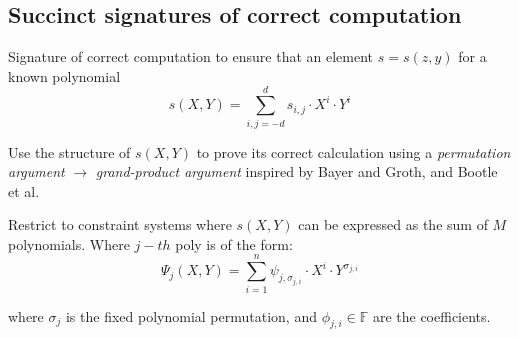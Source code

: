 \documentclass{article}
\theoremstyle{definition}
\begin{document}
\subsection{Succinct signatures of correct computation}
Signature of correct computation to ensure that an element $s=s(z, y)$ for a known polynomial
$$s(X, Y) = \sum_{i, j = -d}^d s_{i, j} \cdot X^i \cdot Y^i$$

Use the structure of $s(X, Y)$ to prove its correct calculation using a \emph{permutation argument} $\longrightarrow$ \emph{grand-product argument} inspired by Bayer and Groth, and Bootle et al.

Restrict to constraint systems where $s(X, Y)$ can be expressed as the sum of $M$ polynomials. Where $j-th$ poly is of the form:
$$
\Psi_j(X, Y) =
    \sum_{i=1}^n \psi_{j, \sigma_{j, i}}
    \cdot X^i \cdot Y^{\sigma_{j, i}}
$$

where $\sigma_j$ is the fixed polynomial permutation, and $\phi_{j, i} \in \mathbb{F}$ are the coefficients.

\vspace{1cm}
\vspace{1cm}





\end{document}
